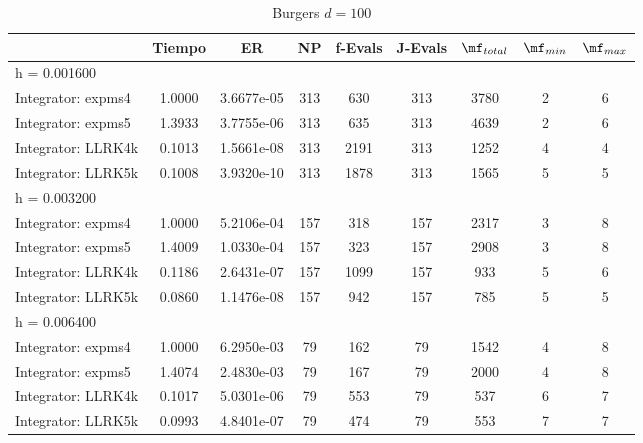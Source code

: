 \begin{table}[htb]
	\centering
\begin{tabular}{l|c|c|c|c|c|c|c|c}
\hline
& Tiempo & ER & NP & f-Evals & J-Evals & $\mf_{total}$ & $\mf_{min}$ & $\mf_{max}$ \\
\hline h = 0.001600 &  &  &  &  &  &  &  &  \\
 Integrator: expms4 & 1.0000 & 3.6677e-05 & 313 & 630 & 313 & 3780 & 2 & 6  \\
Integrator: expms5 & 1.3933 & 3.7755e-06 & 313 & 635 & 313 & 4639 & 2 & 6  \\
Integrator: LLRK4k & 0.1013 & 1.5661e-08 & 313 & 2191 & 313 & 1252 & 4 & 4  \\
Integrator: LLRK5k & 0.1008 & 3.9320e-10 & 313 & 1878 & 313 & 1565 & 5 & 5  \\
\hline
\hline h = 0.003200 &  &  &  &  &  &  &  &  \\
 Integrator: expms4 & 1.0000 & 5.2106e-04 & 157 & 318 & 157 & 2317 & 3 & 8  \\
Integrator: expms5 & 1.4009 & 1.0330e-04 & 157 & 323 & 157 & 2908 & 3 & 8  \\
Integrator: LLRK4k & 0.1186 & 2.6431e-07 & 157 & 1099 & 157 & 933 & 5 & 6  \\
Integrator: LLRK5k & 0.0860 & 1.1476e-08 & 157 & 942 & 157 & 785 & 5 & 5  \\
\hline
\hline h = 0.006400 &  &  &  &  &  &  &  &  \\
 Integrator: expms4 & 1.0000 & 6.2950e-03 & 79 & 162 & 79 & 1542 & 4 & 8  \\
Integrator: expms5 & 1.4074 & 2.4830e-03 & 79 & 167 & 79 & 2000 & 4 & 8  \\
Integrator: LLRK4k & 0.1017 & 5.0301e-06 & 79 & 553 & 79 & 537 & 6 & 7  \\
Integrator: LLRK5k & 0.0993 & 4.8401e-07 & 79 & 474 & 79 & 553 & 7 & 7  \\
\hline
\end{tabular}
\caption{Burgers $d=100$}
\end{table}
